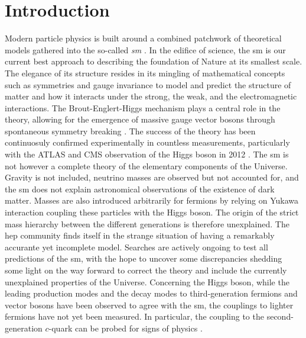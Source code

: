 \chapter{\color{oxfordblue} Introduction}
\ChapFrame

Modern particle physics is built around a combined patchwork of theoretical models gathered into the so-called \textit{\gls{sm}} \cite{Schwartz_2013, SMphysics}. In the edifice of science, the \gls{sm} is our current best approach to describing the foundation of Nature at its smallest scale. The elegance of its structure resides in its mingling of mathematical concepts such as symmetries and gauge invariance to model and predict the structure of matter and how it interacts under the strong, the weak, and the electromagnetic interactions. The Brout-Englert-Higgs mechanism plays a central role in the theory, allowing for the emergence of massive gauge vector bosons through spontaneous symmetry breaking \cite{Englert:1964et,  PhysRevLett.13.508}. The success of the theory has been continuosuly confirmed experimentally in countless measurements, particularly with the ATLAS and CMS observation of the Higgs boson in 2012 \cite{ATLAS:2012yve, CMS:2012qbp}. The \gls{sm} is not however a complete theory of the elementary components of the Universe. Gravity is not included, neutrino masses are observed but not accounted for, and the \gls{sm} does not explain astronomical observations of the existence of dark matter. Masses are also introduced arbitrarily for fermions by relying on Yukawa interaction coupling these particles with the Higgs boson. The origin of the strict mass hierarchy between the different generations is therefore unexplained. The \gls{hep} community finds itself in the strange situation of having a remarkably accurante yet incomplete model. Searches are actively ongoing to test all predictions of the \gls{sm}, with the hope to uncover some discrepancies shedding some light on the way forward to correct the theory and include the currently unexplained properties of the Universe. Concerning the Higgs boson, while the leading production modes and the decay modes to third-generation fermions and vector bosons have been observed to agree with the \gls{sm}, the couplings to lighter fermions have not yet been measured. In particular, the coupling to the second-generation $c$-quark can be probed for signs of physics  \cite{PhysRevD.89.033014,PhysRevD.92.033016,Botella:2016krk,PhysRevD.98.055001,GHOSH2016504,PhysRevLett.123.031802,PhysRevD.100.115041}. \\

